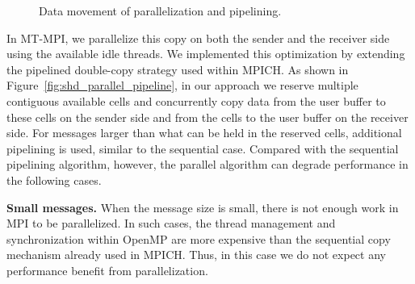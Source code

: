\begin{figure}[h]
  \vspace{-2.0ex}
  \hfill
  \vspace{-2.0ex}
  \caption{Data movement of parallelization and pipelining.}
  \vspace{-2.0ex}
  \label{fig:shd_parallel_datamove}
\end{figure}

In MT-MPI, we parallelize this copy on both the sender and the
receiver side using the available idle threads.  We implemented this
optimization by extending the pipelined double-copy strategy used
within MPICH.  As shown in Figure~\ref{fig:shd_parallel_pipeline}, in
our approach we reserve multiple contiguous available cells and
concurrently copy data from the user buffer to these cells on the
sender side and from the cells to the user buffer on the receiver
side.  For messages larger than what can be held in the reserved
cells, additional pipelining is used, similar to the sequential case.
Compared with the sequential pipelining algorithm, however, the
parallel algorithm can degrade performance in the following cases.

\vspace{1.0ex}
\noindent\textbf{Small messages.}  When the message size is small,
there is not enough work in MPI to be parallelized.  In such cases,
the thread management and synchronization within OpenMP are more
expensive than the sequential copy mechanism already used in MPICH.
Thus, in this case we do not expect any performance benefit from
parallelization.

